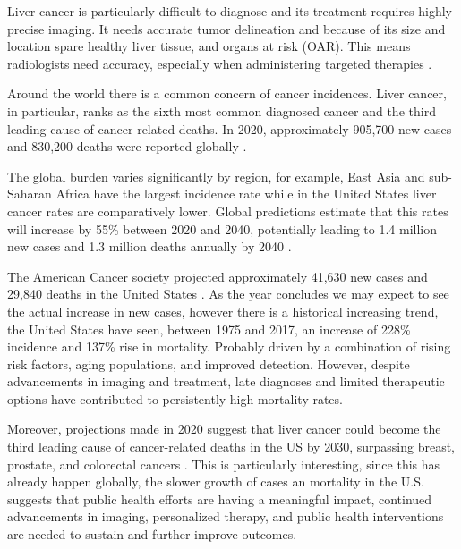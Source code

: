 

Liver cancer is particularly difficult to diagnose and its treatment requires highly precise imaging. It needs accurate tumor delineation and because of its size and location spare healthy liver tissue, and organs at risk (OAR). This means radiologists need accuracy, especially when administering targeted therapies \cite{beaton2019, floridi2022}.

Around the world there is a common concern of cancer incidences. Liver cancer, in particular, ranks as the sixth most common diagnosed cancer and the third leading cause of cancer-related deaths. In 2020, approximately 905,700 new cases and 830,200 deaths were reported globally \cite{journal_of_hepatology2022}. 


The global burden varies significantly by region, for example, East Asia and sub-Saharan Africa have the largest incidence rate while in the United States liver cancer rates are comparatively lower. Global predictions estimate that this rates will increase by 55\% between 2020 and 2040, potentially leading to 1.4 million new cases and 1.3 million deaths annually by 2040 \cite{journal_of_hepatology2022}.

The American Cancer society projected approximately 41,630 new cases and 29,840 deaths in the United States \cite{cancer_stats2024}. As the year concludes we may expect to see the actual increase in new cases, however there is a historical increasing trend, the United States have seen, between 1975 and 2017, an increase of 228\% incidence and 137\% rise in mortality. Probably driven by a combination of rising risk factors, aging populations, and improved detection. However, despite advancements in imaging and treatment, late diagnoses and limited therapeutic options have contributed to persistently high mortality rates.

Moreover, projections made in 2020 suggest that liver cancer could become the third leading cause of cancer-related deaths in the US by 2030, surpassing breast, prostate, and colorectal cancers \cite{aacr_2030}. This is particularly interesting, since this has already happen globally, the slower growth of cases an mortality in the U.S. suggests that public health efforts are having a meaningful impact, continued advancements in imaging, personalized therapy, and public health interventions are needed to sustain and further improve outcomes.

